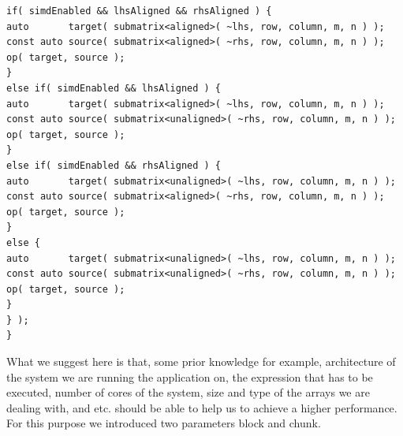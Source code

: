 \begin{lstlisting}[basicstyle=\fontsize{8}{9}\selectfont,float,floatplacement=H,caption= {Previous implementation of Assign function for HPX backend in Blaze.}, label={old_hpx_backend}]
if( simdEnabled && lhsAligned && rhsAligned ) {
auto       target( submatrix<aligned>( ~lhs, row, column, m, n ) );
const auto source( submatrix<aligned>( ~rhs, row, column, m, n ) );
op( target, source );
}
else if( simdEnabled && lhsAligned ) {
auto       target( submatrix<aligned>( ~lhs, row, column, m, n ) );
const auto source( submatrix<unaligned>( ~rhs, row, column, m, n ) );
op( target, source );
}
else if( simdEnabled && rhsAligned ) {
auto       target( submatrix<unaligned>( ~lhs, row, column, m, n ) );
const auto source( submatrix<aligned>( ~rhs, row, column, m, n ) );
op( target, source );
}
else {
auto       target( submatrix<unaligned>( ~lhs, row, column, m, n ) );
const auto source( submatrix<unaligned>( ~rhs, row, column, m, n ) );
op( target, source );
}
} );
}
\end{lstlisting}

What we suggest here is that, some prior knowledge for example, architecture of the system we are running the application on, the expression that has to be executed, number of cores of the system, size and type of the arrays we are dealing with, and etc. should be able to help us to achieve a higher performance.
For this purpose we introduced two parameters block and chunk.

